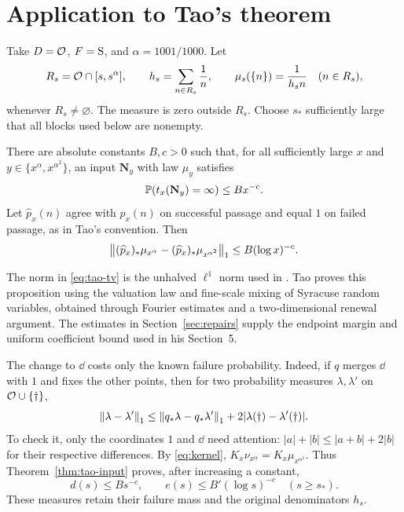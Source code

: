 \section{Application to Tao's theorem}\label{sec:consequences}

Take $D=\mathcal O$, $F=\mathrm S$, and $\alpha=1001/1000$.  Let
\[
 R_s=\mathcal O\cap[s,s^\alpha],\qquad
 h_s=\sum_{n\in R_s}\frac1n,\qquad
 \mu_s(\{n\})=\frac{1}{h_s n}\quad(n\in R_s),
\]
whenever $R_s\ne\varnothing$.  The measure is zero outside $R_s$.
Choose $s_*$ sufficiently large that all blocks used below are nonempty.

\begin{theorem}\label{thm:tao-input}
There are absolute constants $B,c>0$ such that, for all sufficiently
large $x$ and $y\in\{x^\alpha,x^{\alpha^2}\}$, an input $\mathbf N_y$
with law $\mu_y$ satisfies
\[
 \mathbb P(t_x(\mathbf N_y)=\infty)\leq Bx^{-c}.
\]
Let $\widehat p_x(n)$ agree with $p_x(n)$ on successful passage and
equal $1$ on failed passage, as in Tao's convention.  Then
\begin{equation}\label{eq:tao-tv}
 \left\|(\widehat p_x)_*\mu_{x^\alpha}
 -(\widehat p_x)_*\mu_{x^{\alpha^2}}\right\|_1
 \leq B(\log x)^{-c}.
\end{equation}
\end{theorem}

The norm in \eqref{eq:tao-tv} is the unhalved $\ell^1$ norm used in
\cite{Tao7}.  Tao proves this proposition using the valuation law and
fine-scale mixing of Syracuse random variables, obtained through Fourier
estimates and a two-dimensional renewal argument.  The estimates in
Section~\ref{sec:repairs} supply the endpoint margin and uniform
coefficient bound used in his Section~5.

The change to $\dd$ costs only the known failure probability.  Indeed,
if $q$ merges $\dd$ with $1$ and fixes the other points, then for two
probability measures $\lambda,\lambda'$ on $\mathcal O\cup\{\dagger\}$,
\begin{equation}\label{eq:unmerge}
 \left\|\lambda-\lambda'\right\|_1
 \leq\left\|q_*\lambda-q_*\lambda'\right\|_1
 +2|\lambda(\dagger)-\lambda'(\dagger)|.
\end{equation}
To check it, only the coordinates $1$ and $\dd$ need attention:
$|a|+|b|\leq|a+b|+2|b|$ for their respective differences.
By \eqref{eq:kernel},
$K_x\nu_{x^\alpha}=K_x\mu_{x^{\alpha^2}}$.
Thus Theorem~\ref{thm:tao-input} proves, after increasing a constant,
\begin{equation}\label{eq:input-completed}
 d(s)\leq Bs^{-c},\qquad e(s)\leq B'(\log s)^{-c}
 \quad(s\geq s_*).
\end{equation}
These measures retain their failure mass and the original denominators $h_s$.

